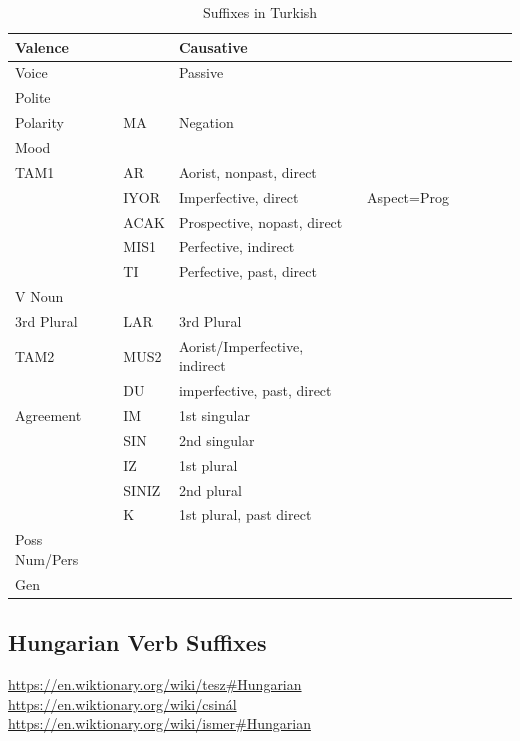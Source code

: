 \documentclass[11pt,letterpaper]{article}
\begin{document}
\begin{table}
\begin{tabular}{llllllll}
\hline
Valence &   & Causative\\
\hline
Voice &   & Passive\\
\hline
Polite &   & \\
\hline
Polarity  & MA & Negation & \\
\hline
Mood \\
\hline
TAM1      & AR & Aorist, nonpast, direct \\
          & IYOR & Imperfective, direct & Aspect=Prog\\
          & ACAK & Prospective, nopast, direct\\
          & MIS1  & Perfective, indirect \\
          & TI & Perfective, past, direct \\
\hline
V Noun &  \\
\hline
3rd Plural& LAR & 3rd Plural\\
\hline
TAM2      & MUS2 & Aorist/Imperfective, indirect \\
          & DU & imperfective, past, direct \\
\hline
Agreement & IM & 1st singular\\
          & SIN &2nd singular\\
          & IZ  & 1st plural\\
          & SINIZ & 2nd plural \\
          & K     & 1st plural, past direct \\
\hline
Poss Num/Pers & \\
\hline
Gen & \\
\hline
\end{tabular}
\caption{Suffixes in Turkish}
\end{table}




\subsection{Hungarian Verb Suffixes}

\url{https://en.wiktionary.org/wiki/tesz#Hungarian}
\url{https://en.wiktionary.org/wiki/csinál}
\url{https://en.wiktionary.org/wiki/ismer#Hungarian}
\end{document}
